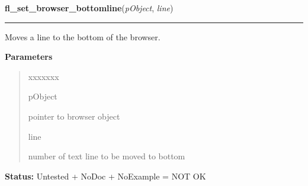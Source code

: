 \hspace{.8\funcindent}\begin{boxedminipage}{\funcwidth}

    \raggedright \textbf{fl\_set\_browser\_bottomline}(\textit{pObject}, \textit{line})

    \vspace{-1.5ex}

    \rule{\textwidth}{0.5\fboxrule}
\setlength{\parskip}{2ex}
    Moves a line to the bottom of the browser.

\setlength{\parskip}{1ex}
      \textbf{Parameters}
      \vspace{-1ex}

      \begin{quote}
        \begin{Ventry}{xxxxxxx}

          \item[pObject]

          pointer to browser object

          \item[line]

          number of text line to be moved to bottom

        \end{Ventry}

      \end{quote}

\textbf{Status:} Untested + NoDoc + NoExample = NOT OK



    \end{boxedminipage}

    \label{xformslib:library:fl_set_browser_fontsize}

    \vspace{0.5ex}

